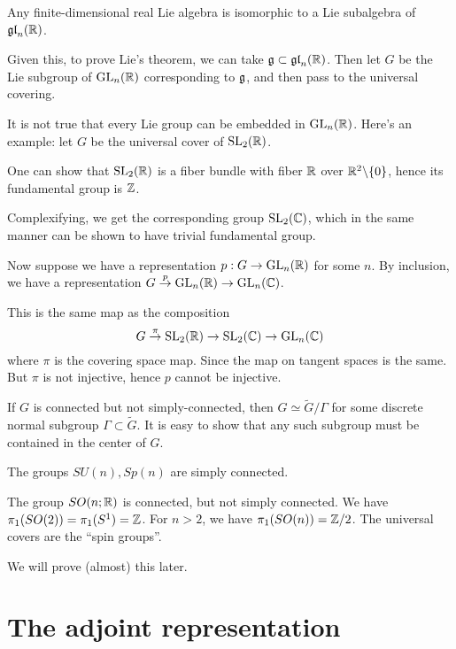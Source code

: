 \documentclass[11pt, english]{article}
\begin{document}
\begin{thm}
Any finite-dimensional real Lie algebra is isomorphic to a Lie subalgebra of $\mathfrak{gl}_n(\mathbb{R})$.
\end{thm}

Given this, to prove Lie's theorem, we can take $\mathfrak g \subset \mathfrak{gl}_n(\mathbb{R})$. Then let $G$ be the Lie subgroup of $\operatorname{GL}_n(\mathbb{R})$ corresponding to $\mathfrak g$, and then pass to the universal covering.

\begin{remark}
  It is not true that every Lie group can be embedded in $\operatorname{GL}_n(\mathbb{R})$. Here's an example: let $G$ be the universal cover of $\operatorname{SL}_2(\mathbb{R})$. 

One can show that $\operatorname{SL}_2(\mathbb{R})$ is a fiber bundle with fiber $\mathbb{R}$ over $\mathbb{R}^2 \backslash \{ 0\}$, hence its fundamental group is $\mathbb{Z}$.

Complexifying, we get the corresponding group $\operatorname{SL}_2(\mathbb{C})$, which in the same manner can be shown to have trivial fundamental group.

Now suppose we have a representation $p:G \to \operatorname{GL}_n(\mathbb{R})$ for some $n$. By inclusion, we have a representation $G \stackrel{p}\to \operatorname{GL}_n(\mathbb{R}) \to \operatorname{GL}_n(\mathbb{C})$. 

This is the same map as the composition
$$
G \stackrel{\pi}{\to} \operatorname{SL}_2(\mathbb{R}) \to \operatorname{SL}_2(\mathbb{C}) \to \operatorname{GL}_n(\mathbb{C})
$$
where $\pi$ is the covering space map. Since the map on tangent spaces is the same. But $\pi$ is not injective, hence $p$ cannot be injective.
\end{remark}

If $G$ is connected but not simply-connected, then $G \simeq \widetilde G / \Gamma$ for some discrete normal subgroup $\Gamma \subset \widetilde G$. It is easy to show that any such subgroup must be contained in the center of $G$.

\begin{example}
  The groups $SU(n), Sp(n)$ are simply connected.

The group $SO(n;\mathbb{R})$ is connected, but not simply connected. We have $\pi_1(SO(2)) = \pi_1(S^1) = \mathbb{Z}$. For $n > 2$, we have $\pi_1(SO(n)) = \mathbb{Z}/2$. The universal covers are the ``spin groups''.

We will prove (almost) this later.
\end{example}


\newpage
\section{The adjoint representation}
\end{document}
